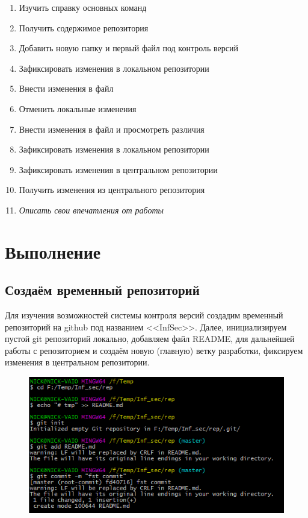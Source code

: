 \documentclass[utf8x, 12pt]{G7-32}
\begin{document}
\begin{enumerate}
	\item Изучить справку основных команд
	\item Получить содержимое репозитория
	\item Добавить новую папку и первый файл под контроль версий
	\item Зафиксировать изменения в локальном репозитории
	\item Внести изменения в файл
	\item Отменить локальные изменения
	\item Внести изменения в файл и просмотреть различия
	\item Зафиксировать изменения в локальном репозитории
	\item Зафиксировать изменения в центральном репозитории
	\item Получить изменения из центрального репозитория
	
	\medskip
	\item {\it Описать свои впечатления от работы}
\end{enumerate}



\chapter{Выполнение}



\section{Создаём временный репозиторий}

Для изучения возможностей системы контроля версий создадим временный репозиторий на github под названием <<InfSec>>. Далее, инициализируем пустой git репозиторий локально, добавляем файл README, для дальнейшей работы с репозиторием и создаём новую (главную) ветку разработки, фиксируем изменения в центральном репозитории.

\begin{figure}[hhh!]
	\begin{center}
		\includegraphics[width=12cm]{img/1}
	\end{center}
\end{figure}	
\end{document}
